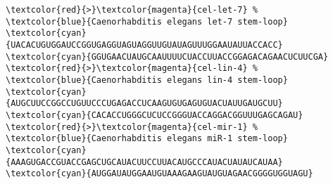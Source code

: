 \begin{Verbatim}[frame=single,commentchar=\%]
\textcolor{red}{>}\textcolor{magenta}{cel-let-7} %
\textcolor{blue}{Caenorhabditis elegans let-7 stem-loop}
\textcolor{cyan}{UACACUGUGGAUCCGGUGAGGUAGUAGGUUGUAUAGUUUGGAAUAUUACCACC}
\textcolor{cyan}{GGUGAACUAUGCAAUUUUCUACCUUACCGGAGACAGAACUCUUCGA}
\textcolor{red}{>}\textcolor{magenta}{cel-lin-4} %
\textcolor{blue}{Caenorhabditis elegans lin-4 stem-loop}
\textcolor{cyan}{AUGCUUCCGGCCUGUUCCCUGAGACCUCAAGUGUGAGUGUACUAUUGAUGCUU}
\textcolor{cyan}{CACACCUGGGCUCUCCGGGUACCAGGACGGUUUGAGCAGAU}
\textcolor{red}{>}\textcolor{magenta}{cel-mir-1} %
\textcolor{blue}{Caenorhabditis elegans miR-1 stem-loop}
\textcolor{cyan}{AAAGUGACCGUACCGAGCUGCAUACUUCCUUACAUGCCCAUACUAUAUCAUAA}
\textcolor{cyan}{AUGGAUAUGGAAUGUAAAGAAGUAUGUAGAACGGGGUGGUAGU}
\end{Verbatim}
